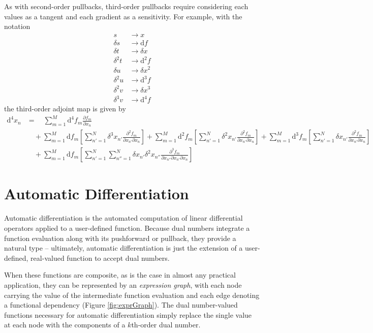 As with second-order pullbacks, third-order pullbacks require considering each values as 
a tangent and each gradient as a sensitivity.  For example, with the notation
%
\begin{align*}
s &\rightarrow x \\
\delta s &\rightarrow \mathrm{d} f \\
\delta t &\rightarrow \delta x \\
\delta^{2} t &\rightarrow \mathrm{d}^{2} f \\
\delta u &\rightarrow \delta x^{2} \\
\delta^{2} u &\rightarrow \mathrm{d}^{3} f \\
\delta^{2} v &\rightarrow \delta x^{3} \\
\delta^{3} v &\rightarrow \mathrm{d}^{4} f
\end{align*}
%
the third-order adjoint map is given by
%
\begin{align*}
\mathrm{d}^{4} x_{n}
&= \quad
\sum_{m = 1}^{M} \mathrm{d}^{4} f_{m} \frac{ \partial f_{m} }{ \partial x_{n} }
\\
& \quad + 
\sum_{m = 1}^{M} \mathrm{d} f_{m}
\left[ \sum_{n'=1}^{N} \delta^{3} x_{n'} \frac{ \partial^{2} f_{m} }{ \partial x_{n'} \partial x_{n} } \right]
+
\sum_{m = 1}^{M} \mathrm{d}^{2} f_{m}
\left[ \sum_{n'=1}^{N} \delta^{2} x_{n'} \frac{ \partial^{2} f_{m} }{ \partial x_{n'} \partial x_{n} } \right]
+
\sum_{m = 1}^{M} \mathrm{d}^{3} f_{m}
\left[ \sum_{n'=1}^{N} \delta x_{n'} \frac{ \partial^{2} f_{m} }{ \partial x_{n'} \partial x_{n} } \right]
\\
& \quad +
\sum_{m = 1}^{M} \mathrm{d} f_{m}
\left[ \sum_{n'=1}^{N} \sum_{n''=1}^{N} \delta x_{n'} \delta^{2} x_{n''} 
\frac{ \partial^{3} f_{m} }{ \partial x_{n''} \partial x_{n'} \partial x_{n} } \right]
\end{align*}

\section{Automatic Differentiation}

Automatic differentiation is the automated computation of linear differential operators applied
to a user-defined function.  Because dual numbers integrate a function evaluation along with
its pushforward or pullback, they provide a natural type -- ultimately, automatic differentiation 
is just the extension of a user-defined, real-valued function to accept dual numbers.

When these functions are composite, as is the case in almost any practical application, they
can be represented by an \textit{expression graph}, with each node carrying the value of
the intermediate function evaluation and each edge denoting a functional dependency
(Figure \ref{fig:exprGraph}).  The dual number-valued functions necessary for automatic
differentiation simply replace the single value at each node with the components of a
$k$th-order dual number.

